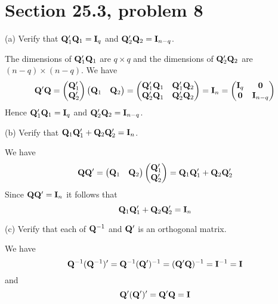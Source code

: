 \section{Section 25.3, problem 8}
(a) Verify that ${\bf Q}'_1{\bf Q}_1={\bf I}_q$ and
${\bf Q}'_2{\bf Q}_2={\bf I}_{n-q}$.

\bigskip
\noindent
The dimensions of ${\bf Q}'_1{\bf Q}_1$ are $q\times q$ and the
dimensions of ${\bf Q}'_2{\bf Q}_2$ are $(n-q)\times(n-q)$.
We have
$${\bf Q}'{\bf Q}=\left(\begin{matrix}
{\bf Q}'_1\cr
{\bf Q}'_2
\end{matrix}\right)\left(\begin{matrix}
{\bf Q}_1 & {\bf Q}_2\end{matrix}\right)=\left(\begin{matrix}
{\bf Q}'_1{\bf Q}_1 & {\bf Q}'_1{\bf Q}_2\cr
{\bf Q}'_2{\bf Q}_1 & {\bf Q}'_2{\bf Q}_2
\end{matrix}\right)={\bf I}_n=\left(\begin{matrix}
{\bf I}_q & {\bf 0}\cr
{\bf 0} & {\bf I}_{n-q}
\end{matrix}\right)
$$
Hence 
${\bf Q}'_1{\bf Q}_1={\bf I}_q$ and
${\bf Q}'_2{\bf Q}_2={\bf I}_{n-q}$.

\bigskip
\noindent
(b) Verify that ${\bf Q}_1{\bf Q}'_1+{\bf Q}_2{\bf Q}'_2={\bf I}_n$.

\bigskip
\noindent
We have
$$
{\bf Q}{\bf Q}'
=
\left(\begin{matrix}
{\bf Q}_1 & {\bf Q}_2
\end{matrix}\right)
%
\left(\begin{matrix}
{\bf Q}'_1\cr
{\bf Q}'_2
\end{matrix}\right)
={\bf Q}_1{\bf Q}'_1+{\bf Q}_2{\bf Q}'_2
$$
Since ${\bf Q}{\bf Q}'={\bf I}_n$ it follows that
$${\bf Q}_1{\bf Q}'_1+{\bf Q}_2{\bf Q}'_2={\bf I}_n$$

\bigskip
\noindent
(c) Verify that each of ${\bf Q}^{-1}$ and ${\bf Q}'$ is an
orthogonal matrix.

\bigskip
\noindent
We have
$${\bf Q}^{-1}({\bf Q}^{-1})'={\bf Q}^{-1}({\bf Q}')^{-1}
=({\bf Q}'{\bf Q})^{-1}={\bf I}^{-1}={\bf I}$$
and
$${\bf Q}'({\bf Q}')'={\bf Q}'{\bf Q}={\bf I}$$
